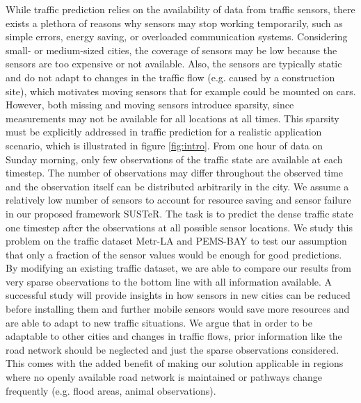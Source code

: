 While traffic prediction relies on the availability of data from traffic sensors, there exists a plethora of reasons why sensors may stop working temporarily, such as simple errors, energy saving, or overloaded communication systems.
Considering small- or medium-sized cities, the coverage of sensors may be low because the sensors are too expensive or not available.
Also, the sensors are typically static and do not adapt to changes in the traffic flow (e.g. caused by a construction site), which motivates moving sensors that for example could be mounted on cars. 
However, both missing and moving sensors introduce sparsity, since measurements may not be available for all locations at all times.
This sparsity must be explicitly addressed in traffic prediction for a realistic application scenario, which is illustrated in figure \ref{fig:intro}.
From one hour of data on Sunday morning, only few observations of the traffic state are available at each timestep.
The number of observations may differ throughout the observed time and the observation itself can be distributed arbitrarily in the city. 
We assume a relatively low number of sensors to account for resource saving and sensor failure in our proposed framework SUSTeR.
The task is to predict the dense traffic state one timestep after the observations at all possible sensor locations.
We study this problem on the traffic dataset Metr-LA and PEMS-BAY to test our assumption that only a fraction of the sensor values would be enough for good predictions.
By modifying an existing traffic dataset, we are able to compare our results from very sparse observations to the bottom line with all information available.
A successful study will provide insights in how sensors in new cities can be reduced before installing them and further mobile sensors would save more resources and are able to adapt to new traffic situations.
We argue that in order to be adaptable to other cities and changes in traffic flows, prior information like the road network should be neglected and just the sparse observations considered.
This comes with the added benefit of making our solution applicable in regions where no openly available road network is maintained or pathways change frequently (e.g. flood areas, animal observations). 



